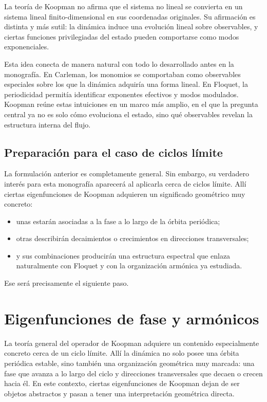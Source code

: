 La teoría de Koopman no afirma que el sistema no lineal se convierta en un sistema lineal finito-dimensional en sus coordenadas originales. Su afirmación es distinta y más sutil: la dinámica induce una evolución lineal sobre observables, y ciertas funciones privilegiadas del estado pueden comportarse como modos exponenciales.

Esta idea conecta de manera natural con todo lo desarrollado antes en la monografía. En Carleman, los monomios se comportaban como observables especiales sobre los que la dinámica adquiría una forma lineal. En Floquet, la periodicidad permitía identificar exponentes efectivos y modos modulados. Koopman reúne estas intuiciones en un marco más amplio, en el que la pregunta central ya no es solo cómo evoluciona el estado, sino qué observables revelan la estructura interna del flujo.

\subsection{Preparación para el caso de ciclos límite}

La formulación anterior es completamente general. Sin embargo, su verdadero interés para esta monografía aparecerá al aplicarla cerca de ciclos límite. Allí ciertas eigenfunciones de Koopman adquieren un significado geométrico muy concreto:
\begin{itemize}
\item unas estarán asociadas a la fase a lo largo de la órbita periódica;
\item otras describirán decaimientos o crecimientos en direcciones transversales;
\item y sus combinaciones producirán una estructura espectral que enlaza naturalmente con Floquet y con la organización armónica ya estudiada.
\end{itemize}

Ese será precisamente el siguiente paso.
\section{Eigenfunciones de fase y armónicos}

La teoría general del operador de Koopman adquiere un contenido especialmente concreto cerca de un ciclo límite. Allí la dinámica no solo posee una órbita periódica estable, sino también una organización geométrica muy marcada: una fase que avanza a lo largo del ciclo y direcciones transversales que decaen o crecen hacia él. En este contexto, ciertas eigenfunciones de Koopman dejan de ser objetos abstractos y pasan a tener una interpretación geométrica directa.

